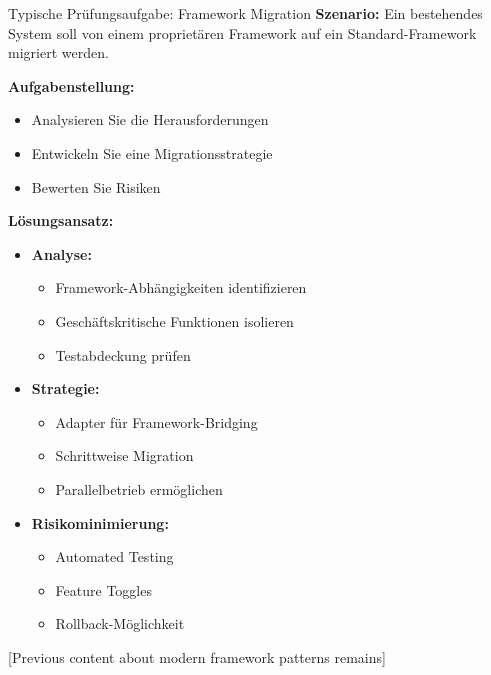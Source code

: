 \begin{example}{Typische Prüfungsaufgabe: Framework Migration}
\textbf{Szenario:}
Ein bestehendes System soll von einem proprietären Framework auf ein Standard-Framework 
migriert werden.

\textbf{Aufgabenstellung:}
\begin{itemize}
    \item Analysieren Sie die Herausforderungen
    \item Entwickeln Sie eine Migrationsstrategie
    \item Bewerten Sie Risiken
\end{itemize}

\textbf{Lösungsansatz:}
\begin{itemize}
    \item \textbf{Analyse:}
    \begin{itemize}
        \item Framework-Abhängigkeiten identifizieren
        \item Geschäftskritische Funktionen isolieren
        \item Testabdeckung prüfen
    \end{itemize}
    
    \item \textbf{Strategie:}
    \begin{itemize}
        \item Adapter für Framework-Bridging
        \item Schrittweise Migration
        \item Parallelbetrieb ermöglichen
    \end{itemize}
    
    \item \textbf{Risikominimierung:}
    \begin{itemize}
        \item Automated Testing
        \item Feature Toggles
        \item Rollback-Möglichkeit
    \end{itemize}
\end{itemize}
\end{example}

[Previous content about modern framework patterns remains]